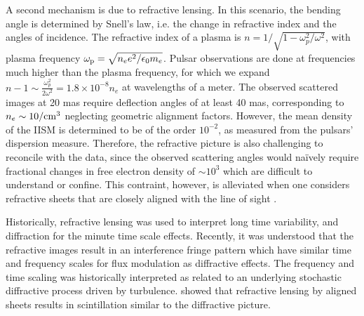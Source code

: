 \documentclass[useAMS,usenatbib]{mn2e}
\begin{document}
A second mechanism is due to refractive lensing.  In this scenario,
the bending angle is determined by Snell's law, i.e. the change in
refractive index and the angles of incidence.  The refractive index of
a plasma is $n=1/\sqrt{1-\omega_p^2/\omega^2}$, with plasma frequency
$\omega_{\rm p}=\sqrt{n_e e^2/\epsilon_{0}m_e}$.  Pulsar observations
are done at frequencies much higher than the plasma frequency, for which
we expand $n-1 \sim \frac{\omega_p^2}{2 \omega^2} = 1.8\times 10^{-8}
n_e$ at wavelengths of a meter.  The observed scattered images at 20
mas require deflection 
angles of at least 40 mas, corresponding to $n_e \sim 10/{\rm cm}^3$ neglecting
geometric alignment factors.  However, the mean density of the IISM is
determined to be
of the order $10^{-2}$, as measured  from the pulsars' dispersion measure\citep{2004hpa..book.....L}.
Therefore, the refractive picture is  also challenging to reconcile with the data, since the observed
scattering angles would na\"ively require fractional changes in free electron
density of $\sim 10^3$ 
which are difficult to understand or confine. This contraint, however, is alleviated
when one considers refractive sheets that are closely aligned with the line of sight
\citep{2006ApJ...640L.159G}.

Historically, refractive lensing was used to interpret long time
variability, and diffraction for the minute time scale
effects. Recently, it was understood that the refractive images result
in an interference fringe pattern \citep{2004MNRAS.354...43W} which have
similar time and frequency scales for flux modulation as diffractive
effects.  The frequency and time scaling was historically interpreted
as related to an underlying stochastic diffractive process driven by
turbulence.
\cite{2006ApJ...640L.159G} showed that refractive lensing by aligned
sheets  results in
scintillation similar to the diffractive picture.




\end{document}
